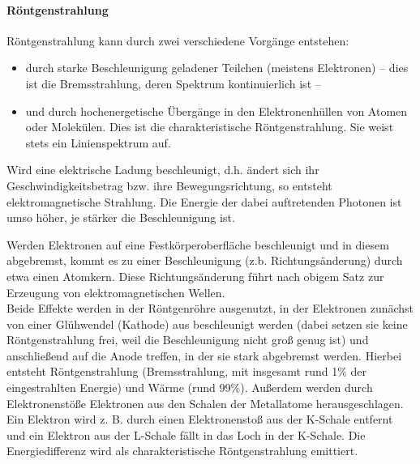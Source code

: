 			\paragraph{Röntgenstrahlung}
				Röntgenstrahlung kann durch zwei verschiedene Vorgänge entstehen:
				\begin{itemize}
					\item durch starke Beschleunigung geladener Teilchen (meistens Elektronen) -- dies ist die Bremsstrahlung, deren Spektrum kontinuierlich ist --
					\item und durch hochenergetische Übergänge in den Elektronenhüllen von Atomen oder Molekülen. Dies ist die charakteristische Röntgenstrahlung. Sie weist stets ein Linienspektrum auf.
				\end{itemize}
				\begin{tcolorbox}[title=Bremsstrahlung:]
					Wird eine elektrische Ladung beschleunigt, d.h. ändert sich ihr Geschwindigkeitsbetrag bzw. ihre Bewegungsrichtung, so entsteht elektromagnetische Strahlung. Die Energie der dabei auftretenden Photonen ist umso höher, je stärker die Beschleunigung ist.
				\end{tcolorbox}		
				Werden Elektronen auf eine Festkörperoberfläche beschleunigt und in diesem abgebremst, kommt es zu einer Beschleunigung (z.b. Richtungsänderung) durch etwa einen Atomkern. Diese Richtungsänderung führt nach obigem Satz zur Erzeugung von elektromagnetischen Wellen.\\
				Beide Effekte werden in der Röntgenröhre ausgenutzt, in der Elektronen zunächst von einer Glühwendel (Kathode) aus beschleunigt werden (dabei setzen sie keine Röntgenstrahlung frei, weil die Beschleunigung nicht groß genug ist) und anschließend auf die Anode treffen, in der sie stark abgebremst werden. Hierbei entsteht Röntgenstrahlung (Bremsstrahlung, mit insgesamt rund 1\% der eingestrahlten Energie) und Wärme (rund 99\%). Außerdem werden durch Elektronenstöße Elektronen aus den Schalen der Metallatome herausgeschlagen. 
				Ein Elektron wird z. B. durch einen Elektronenstoß aus der K-Schale entfernt und ein Elektron aus der L-Schale fällt in das Loch in der K-Schale. Die Energiedifferenz wird als charakteristische Röntgenstrahlung emittiert.
